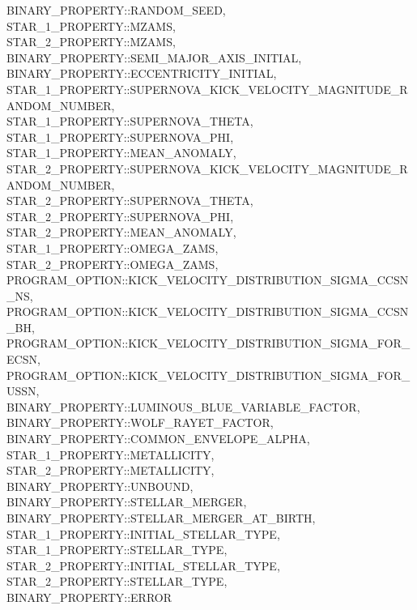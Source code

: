 \hfill
\begin{minipage}{\dimexpr\textwidth-2em}
    BINARY\_PROPERTY::RANDOM\_SEED, \\
    STAR\_1\_PROPERTY::MZAMS, \\
    STAR\_2\_PROPERTY::MZAMS, \\
    BINARY\_PROPERTY::SEMI\_MAJOR\_AXIS\_INITIAL, \\
    BINARY\_PROPERTY::ECCENTRICITY\_INITIAL, \\
    STAR\_1\_PROPERTY::SUPERNOVA\_KICK\_VELOCITY\_MAGNITUDE\_RANDOM\_NUMBER, \\
    STAR\_1\_PROPERTY::SUPERNOVA\_THETA, \\
    STAR\_1\_PROPERTY::SUPERNOVA\_PHI, \\
    STAR\_1\_PROPERTY::MEAN\_ANOMALY, \\
    STAR\_2\_PROPERTY::SUPERNOVA\_KICK\_VELOCITY\_MAGNITUDE\_RANDOM\_NUMBER, \\
    STAR\_2\_PROPERTY::SUPERNOVA\_THETA, \\
    STAR\_2\_PROPERTY::SUPERNOVA\_PHI, \\
    STAR\_2\_PROPERTY::MEAN\_ANOMALY, \\
    STAR\_1\_PROPERTY::OMEGA\_ZAMS, \\
    STAR\_2\_PROPERTY::OMEGA\_ZAMS, \\
    PROGRAM\_OPTION::KICK\_VELOCITY\_DISTRIBUTION\_SIGMA\_CCSN\_NS, \\
    PROGRAM\_OPTION::KICK\_VELOCITY\_DISTRIBUTION\_SIGMA\_CCSN\_BH, \\
    PROGRAM\_OPTION::KICK\_VELOCITY\_DISTRIBUTION\_SIGMA\_FOR\_ECSN, \\
    PROGRAM\_OPTION::KICK\_VELOCITY\_DISTRIBUTION\_SIGMA\_FOR\_USSN, \\
    BINARY\_PROPERTY::LUMINOUS\_BLUE\_VARIABLE\_FACTOR, \\
    BINARY\_PROPERTY::WOLF\_RAYET\_FACTOR, \\
    BINARY\_PROPERTY::COMMON\_ENVELOPE\_ALPHA, \\
    STAR\_1\_PROPERTY::METALLICITY, \\
    STAR\_2\_PROPERTY::METALLICITY, \\
    BINARY\_PROPERTY::UNBOUND, \\
    BINARY\_PROPERTY::STELLAR\_MERGER, \\
    BINARY\_PROPERTY::STELLAR\_MERGER\_AT\_BIRTH, \\
    STAR\_1\_PROPERTY::INITIAL\_STELLAR\_TYPE, \\
    STAR\_1\_PROPERTY::STELLAR\_TYPE, \\
    STAR\_2\_PROPERTY::INITIAL\_STELLAR\_TYPE, \\
    STAR\_2\_PROPERTY::STELLAR\_TYPE, \\
    BINARY\_PROPERTY::ERROR
\end{minipage}
\par\rcb{;}

